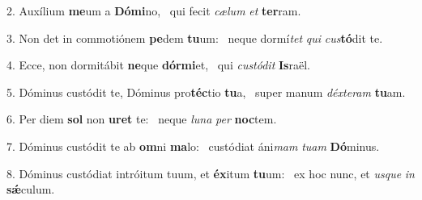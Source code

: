 2. Auxílium \textbf{me}um a \textbf{Dó}\textbf{mi}no, \ast\  qui fecit \textit{cæ}\textit{lum} \textit{et} \textbf{ter}ram.\

3. Non det in commotiónem \textbf{pe}dem \textbf{tu}um: \ast\  neque dormí\textit{tet} \textit{qui} \textit{cus}\textbf{tó}dit te.\

4. Ecce, non dormitábit \textbf{ne}que \textbf{dór}\textbf{mi}et, \ast\  qui \textit{cus}\textit{tó}\textit{dit} \textbf{Is}raël.\

5. Dóminus custódit te, Dóminus pro\textbf{téc}tio \textbf{tu}a, \ast\  super manum \textit{déx}\textit{te}\textit{ram} \textbf{tu}am.\

6. Per diem \textbf{sol} non \textbf{u}\textbf{ret} te: \ast\  neque \textit{lu}\textit{na} \textit{per} \textbf{noc}tem.\

7. Dóminus custódit te ab \textbf{om}ni \textbf{ma}lo: \ast\  custódiat áni\textit{mam} \textit{tu}\textit{am} \textbf{Dó}minus.\

8. Dóminus custódiat intróitum tuum, et \textbf{éx}itum \textbf{tu}um: \ast\  ex hoc nunc, et \textit{us}\textit{que} \textit{in} \textbf{sǽ}culum.\

